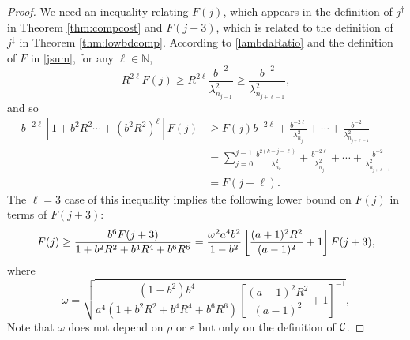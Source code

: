\documentclass[graybox,footinfo]{svmult}
\begin{document}
\begin{proof} 
{\color{red} We need an inequality relating $F(j)$, which appears in the definition of $j^\dagger$ in Theorem \ref{thm:compcost} and $F(j+3)$, which is related to the definition of $j^\ddagger$ in Theorem \ref{thm:lowbdcomp}.  According to \eqref{lambdaRatio} and the definition of $F$ in \eqref{jsum}, for any $\ell \in \mathbb{N}$,
\begin{equation*}
R^{2\ell} F(j) \ge R^{2\ell} \frac{b^{-2}}{\lambda_{n_{j-1}}^2} \geq \frac{b^{-2}}{\lambda_{n_{j+\ell-1}}^2},
\end{equation*}
and so
\begin{align*}
b^{-2\ell}[1 + b^2R^2\cdots + (b^2R^2)^\ell] F(j) & \ge F(j)b^{-2\ell} + \frac{b^{-2\ell}}{\lambda_{n_{j}}^2} + \cdots + \frac{b^{-2}}{\lambda_{n_{j+\ell-1}}^2} \\
& = \sum_{j=0}^{j-1} \frac{b^{2(k - j -\ell)}}{\lambda_{n_{k}}^2} + \frac{b^{-2\ell}}{\lambda_{n_{j}}^2} + \cdots + \frac{b^{-2}}{\lambda_{n_{j+\ell-1}}^2} \\
& = F(j + \ell).
\end{align*}
The $\ell=3$ case of this inequality implies the following lower bound on $F(j)$ in terms of $F(j+3)$:
\begin{equation*} 
F(j) \ge  \frac{b^6 F(j+3)}{1 + b^2R^2 + b^4R^4 + b^6R^6} \\
=  \frac{\omega^2 a^4 b^2}{1 - b^2}\left[\frac{(a+1)^{2} R^2 }{(a-1)^2} + 1\right] F(j+3),
\end{equation*}
where
\begin{equation} \label{newomegadef}
\omega = \sqrt{\frac{(1 - b^2)b^4}{a^4(1 + b^2R^2 + b^4R^4 + b^6R^6)}\left[\frac{(a+1)^{2} R^2 }{(a-1)^2} + 1\right]^{-1}},
\end{equation}
Note that $\omega$ does not depend on $\rho$ or $\varepsilon$ but only on the definition of ${\mathcal{C}}$.

}
\end{proof}
\end{document}
